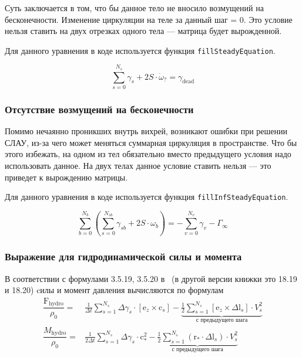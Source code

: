 \documentclass[14pt]{extreport}
\newcommand{\br}[1]{\boldsymbol{\mathrm{#1}}}
\renewcommand{\vec}[1]{\br{#1}}
\begin{document}
Суть заключается в том, что бы данное тело не вносило возмущений на бесконечности.
Изменение циркуляции на теле за данный шаг = 0. Это условие нельзя ставить на двух отрезках одного тела --- матрица будет вырожденной.

Для данного уравнения в коде используется функция \texttt{fillSteadyEquation}.

\begin{equation}
\sum_{s=0}^{N_s} \gamma_s + 2S \cdot \dot \omega_? = \gamma_\text{dead}
\end{equation}

\subsubsection{Отсутствие возмущений на бесконечности}
\label{slau_infsteday}

Помимо нечаянно проникших внутрь вихрей, возникают ошибки при решении СЛАУ, из-за чего может меняться суммарная циркуляция в пространстве.
Что бы этого избежать, на одном из тел обязательно вместо предыдущего условия надо использовать данное. На двух телах данное условие ставить нельзя --- это приведет к вырождению матрицы.

Для данного уравнения в коде используется функция \texttt{fillInfSteadyEquation}.

\begin{equation}
\sum_{b=0}^{N_b} \left( \sum_{s=0}^{N_{sb}} \gamma_{sb} + 2S\cdot\omega_b \right)
=
-\sum\limits_{v=0}^{N_v} \gamma_v - \Gamma_\infty
\end{equation}

\subsubsection{Выражение для гидродинамической силы и момента}
\label{slau_hydroforce}

В соответствии с формулами 3.5.19, 3.5.20 в~\cite{vvd_book} (в другой версии книжки это 18.19 и 18.20) cилы и момент давления вычисляются по формулам
\begin{equation}
\label{eq_force}
\begin{split}
\dfrac{\vec F_\text{hydro}}{\rho_0} =& 
\frac{1}{\Delta t} \sum\limits_{s=1}^{N_s} {\Delta \gamma_s \cdot [\vec e_z \times \vec c_s]} -
\underbrace {
	\frac{1}{2} \sum\limits_{s=1}^{N_s}
		[\vec e_z \times \Delta \vec l_s] \cdot V_s^2
}_{\text{с предыдущего шага}}\\
%
\dfrac{M_\text{hydro}}{\rho_0} =&
\frac{1}{2\Delta t}\sum\limits_{s=1}^{N_s} { \Delta \gamma_s \cdot \vec c_*^2 }
-
\underbrace {
	\frac{1}{2} \sum\limits_{s=1}^{N_s}
		(\vec r_* \cdot \Delta \vec l_s) \cdot V_s^2
}_{\text{с предыдущего шага}}\\
\end{split}
\end{equation}
%
\end{document}
